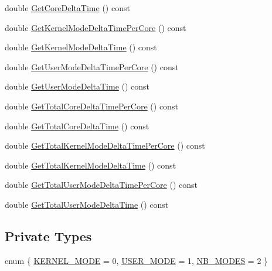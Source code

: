 \begin{DoxyCompactItemize}
\item 
double \hyperlink{classmage_1_1_c_p_u_timer_abb3526d1aca4511e1f6f7cfec53bf15a}{Get\+Core\+Delta\+Time} () const
\item 
double \hyperlink{classmage_1_1_c_p_u_timer_ae69c9126851135ec5d0eda930ace3999}{Get\+Kernel\+Mode\+Delta\+Time\+Per\+Core} () const
\item 
double \hyperlink{classmage_1_1_c_p_u_timer_a6bb5464996283d8ff2161cc683e8c0d1}{Get\+Kernel\+Mode\+Delta\+Time} () const
\item 
double \hyperlink{classmage_1_1_c_p_u_timer_af6f972b523d00a83d5360f61bf0a1e50}{Get\+User\+Mode\+Delta\+Time\+Per\+Core} () const
\item 
double \hyperlink{classmage_1_1_c_p_u_timer_a999022706e5fa8ff4ee8c25de4be0e81}{Get\+User\+Mode\+Delta\+Time} () const
\item 
double \hyperlink{classmage_1_1_c_p_u_timer_af501e54e834f68469dd4a0f128f2da79}{Get\+Total\+Core\+Delta\+Time\+Per\+Core} () const
\item 
double \hyperlink{classmage_1_1_c_p_u_timer_a5fb59355f6c747be98bfb4d924a0a0ec}{Get\+Total\+Core\+Delta\+Time} () const
\item 
double \hyperlink{classmage_1_1_c_p_u_timer_abe27bc40d9e61bdf97755706b4be238c}{Get\+Total\+Kernel\+Mode\+Delta\+Time\+Per\+Core} () const
\item 
double \hyperlink{classmage_1_1_c_p_u_timer_aa9a1db98ad3d46674c733256dedff164}{Get\+Total\+Kernel\+Mode\+Delta\+Time} () const
\item 
double \hyperlink{classmage_1_1_c_p_u_timer_a72bf36dbc5a67f99251125aa6e5c19f6}{Get\+Total\+User\+Mode\+Delta\+Time\+Per\+Core} () const
\item 
double \hyperlink{classmage_1_1_c_p_u_timer_a098c9ecc1f84918970b4644f0ba8bfc4}{Get\+Total\+User\+Mode\+Delta\+Time} () const
\end{DoxyCompactItemize}
\subsection*{Private Types}
\begin{DoxyCompactItemize}
\item 
enum \{ \hyperlink{classmage_1_1_c_p_u_timer_a5adc0497956723a35534dfeb66fa7789ae1a0a7748289875873f8a9948c2234e0}{K\+E\+R\+N\+E\+L\+\_\+\+M\+O\+DE} = 0, 
\hyperlink{classmage_1_1_c_p_u_timer_a5adc0497956723a35534dfeb66fa7789ad5bce4c910796ef2ef4323a0153a2add}{U\+S\+E\+R\+\_\+\+M\+O\+DE} = 1, 
\hyperlink{classmage_1_1_c_p_u_timer_a5adc0497956723a35534dfeb66fa7789ab63e6023ec0bea89568ebb2b98728b77}{N\+B\+\_\+\+M\+O\+D\+ES} = 2
 \}
\end{DoxyCompactItemize}
